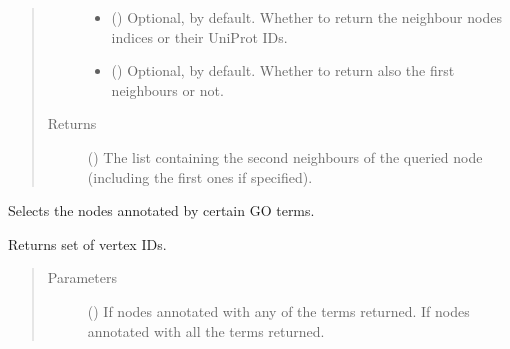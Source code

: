 \documentclass[letterpaper,10pt,english]{sphinxmanual}
\begin{document}
\begin{fulllineitems}
\begin{fulllineitems}
\begin{quote}
\begin{description}
\begin{itemize}
\item {} 
 () \textendash{} Optional,  by default. Whether to return the
neighbour nodes indices or their UniProt IDs.

\item {} 
 () \textendash{} Optional,  by default. Whether to return also the
first neighbours or not.

\end{itemize}

\item[{Returns}] \leavevmode
() \textendash{} The list containing the second neighbours of the
queried node (including the first ones if specified).

\end{description}\end{quote}

\end{fulllineitems}


\begin{fulllineitems}
\label{\detokenize{main:pypath.main.PyPath.select_by_go}}
Selects the nodes annotated by certain GO terms.

Returns set of vertex IDs.
\begin{quote}\begin{description}
\item[{Parameters}] \leavevmode
{} () \textendash{} If  nodes annotated with any of the terms returned.
If  nodes annotated with all the terms returned.

\end{description}\end{quote}

\end{fulllineitems}



\end{fulllineitems}
\end{document}
